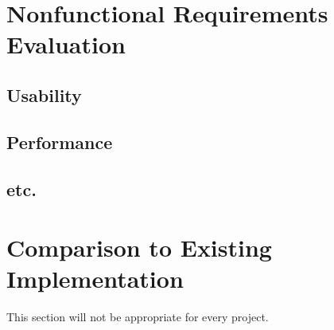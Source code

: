 \documentclass[12pt, titlepage]{article}
\begin{document}
\section{Nonfunctional Requirements Evaluation}

\subsection{Usability}
		
\subsection{Performance}

\subsection{etc.}
	
\section{Comparison to Existing Implementation}	

This section will not be appropriate for every project.
\end{document}
